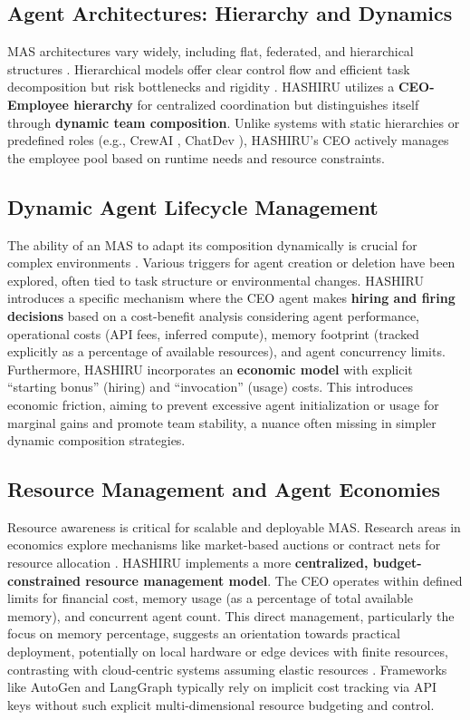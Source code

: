 \documentclass[conference]{IEEEtran}
\begin{document}
\subsection{Agent Architectures: Hierarchy and Dynamics}
MAS architectures vary widely, including flat, federated, and hierarchical structures \cite{dorri2018multi, horling2004survey}. Hierarchical models offer clear control flow and efficient task decomposition but risk bottlenecks and rigidity \cite{gaston2005agenta,gaston2005agentb}. HASHIRU utilizes a \textbf{CEO-Employee hierarchy} for centralized coordination but distinguishes itself through \textbf{dynamic team composition}. Unlike systems with static hierarchies or predefined roles (e.g., CrewAI \cite{crewai}, ChatDev \cite{qian2023communicative}), HASHIRU's CEO actively manages the employee pool based on runtime needs and resource constraints.

\subsection{Dynamic Agent Lifecycle Management}
The ability of an MAS to adapt its composition dynamically is crucial for complex environments \cite{valckenaers2005trends}. Various triggers for agent creation or deletion have been explored, often tied to task structure or environmental changes. HASHIRU introduces a specific mechanism where the CEO agent makes \textbf{hiring and firing decisions} based on a cost-benefit analysis considering agent performance, operational costs (API fees, inferred compute), memory footprint (tracked explicitly as a percentage of available resources), and agent concurrency limits. Furthermore, HASHIRU incorporates an \textbf{economic model} with explicit ``starting bonus'' (hiring) and ``invocation'' (usage) costs. This introduces economic friction, aiming to prevent excessive agent initialization or usage for marginal gains and promote team stability, a nuance often missing in simpler dynamic composition strategies.

\subsection{Resource Management and Agent Economies}
Resource awareness is critical for scalable and deployable MAS. Research areas in economics explore mechanisms like market-based auctions or contract nets for resource allocation \cite{clearwater1996market}. HASHIRU implements a more \textbf{centralized, budget-constrained resource management model}. The CEO operates within defined limits for financial cost, memory usage (as a percentage of total available memory), and concurrent agent count. This direct management, particularly the focus on memory percentage, suggests an orientation towards practical deployment, potentially on local hardware or edge devices with finite resources, contrasting with cloud-centric systems assuming elastic resources \cite{park2023generative}. Frameworks like AutoGen \cite{wu2023autogen} and LangGraph \cite{langgraph} typically rely on implicit cost tracking via API keys without such explicit multi-dimensional resource budgeting and control.
\end{document}
